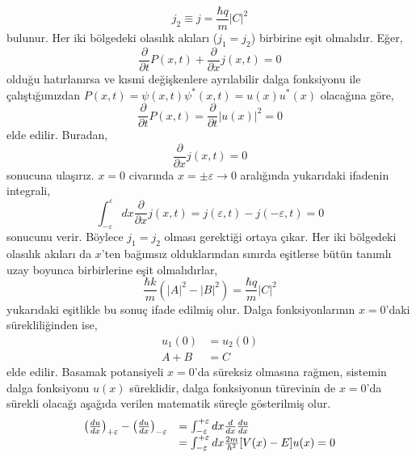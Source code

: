 \documentclass[a4paper,12pt, twoside]{article}
\begin{document}
\begin{equation}
j_2 \equiv j = \frac { \hbar q } { m } | C | ^ { 2 }
\end{equation}
bulunur. Her iki bölgedeki olasılık akıları ($j_1 = j_2$) birbirine eşit olmalıdır. Eğer,
\begin{equation}
\frac { \partial } { \partial t } P ( x , t ) + \frac { \partial } { \partial x } j ( x , t ) = 0
\end{equation}
olduğu hatırlanırsa ve kısmi değişkenlere ayrılabilir dalga fonksiyonu ile çalıştığımızdan $P(x, t) = \psi(x,t) \psi^*(x,t) = u(x) u^*(x)$ olacağına göre,
\begin{equation}\label{key}
\frac { \partial } { \partial t } P ( x , t ) = \frac { \partial } { \partial t } |u ( x)|^2 = 0
\end{equation}
elde edilir. Buradan,
\begin{equation}
\frac { \partial } { \partial x } j ( x , t ) = 0
\end{equation}
sonucuna ulaşırız. $x=0$ civarında $x=\pm\varepsilon \rightarrow 0$ aralığında yukarıdaki ifadenin integrali,
\begin{equation}
\int^{\varepsilon}_{-\varepsilon} dx \frac { \partial } { \partial x } j ( x , t ) = j (\varepsilon  , t ) - j ( -\varepsilon , t ) = 0
\end{equation}
sonucunu verir. Böylece $j_1 = j_2$ olması gerektiği ortaya çıkar. Her iki bölgedeki olasılık akıları da $x$'ten bağımsız olduklarından sınırda eşitlerse bütün tanımlı uzay boyunca birbirlerine eşit olmalıdırlar,
\begin{equation}
\frac { \hbar k } { m } \left( | A | ^ { 2 }  - | B | ^ { 2 } \right) = \frac { \hbar q } { m } | C | ^ { 2 }
\end{equation}
yukarıdaki eşitlikle bu sonuç ifade edilmiş olur. Dalga fonksiyonlarının $x=0$'daki sürekliliğinden ise,
\begin{align}
u_1(0) &= u_2(0) \\
A + B  &= C
\end{align}
elde edilir. Basamak potansiyeli $x=0$'da süreksiz olmasına rağmen, sistemin dalga fonksiyonu $u(x)$ süreklidir, dalga fonksiyonun türevinin de $x=0$'da sürekli olacağı aşağıda verilen matematik süreçle gösterilmiş olur.
\begin{equation}
\begin{array} { r l } { \left( \frac { d u } { d x } \right) _ { +\varepsilon } - \left( \frac { d u } { d x } \right) _ { - \varepsilon } } & { = \int _ { - \varepsilon } ^ { +\varepsilon } d x \frac { d } { d x } \frac { d u } { d x } } \\ { } & { = \int _ { - \varepsilon } ^ { +\varepsilon } d x \frac { 2 m } { \hbar ^ { 2 } } [ V ( x ) - E ] u ( x ) = 0 } \end{array}
\end{equation}
\end{document}
